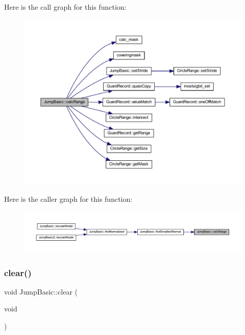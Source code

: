 Here is the call graph for this function\+:
\nopagebreak
\begin{figure}[H]
\begin{center}
\leavevmode
\includegraphics[width=350pt]{class_jump_basic_ad7d08e00d715fb0b2edce7d4d09a71f2_cgraph}
\end{center}
\end{figure}
Here is the caller graph for this function\+:
\nopagebreak
\begin{figure}[H]
\begin{center}
\leavevmode
\includegraphics[width=350pt]{class_jump_basic_ad7d08e00d715fb0b2edce7d4d09a71f2_icgraph}
\end{center}
\end{figure}
\mbox{\label{class_jump_basic_a51a677ac029723dbdee9879d865f7e3f}} 
\subsubsection{\texorpdfstring{clear()}{clear()}}
{\footnotesize\ttfamily void Jump\+Basic\+::clear (\begin{DoxyParamCaption}\item[{void}]{ }\end{DoxyParamCaption})\hspace{0.3cm}{\ttfamily [virtual]}}




